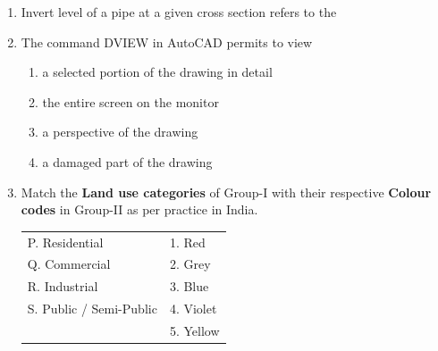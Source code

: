 \documentclass[journal,12pt,onecolumn]{IEEEtran}
\theoremstyle{remark}
\begin{document}
\begin{enumerate}
\begin{enumerate}
    \end{enumerate}
\item Invert level of a pipe at a given cross section refers to the
\begin{enumerate}
\end{enumerate}
\item The command DVIEW in AutoCAD permits to view
\begin{enumerate}
    \item a selected portion of the drawing in detail
    \item the entire screen on the monitor
    \item a perspective of the drawing
    \item a damaged part of the drawing
\end{enumerate}
\item Match the \textbf{Land use categories} of Group-I with their respective \textbf{Colour codes} in Group-II as per practice in India.\\
\begin{tabular}{p{}p{}}
P. Residential     & 1. Red \\
Q. Commercial     & 2. Grey\\
R. Industrial  &  3. Blue\\
S. Public / Semi-Public  &  4. Violet\\
   & 5. Yellow\\
\end{tabular}
\begin{enumerate}

\end{enumerate}
\end{enumerate}
\end{document}
